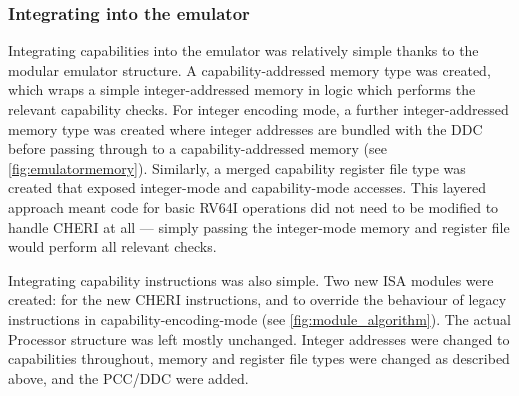 \subsubsection{Integrating into the emulator}
Integrating capabilities into the emulator was relatively simple thanks to the modular emulator structure.
A capability-addressed memory type was created, which wraps a simple integer-addressed memory in logic which performs the relevant capability checks.
For integer encoding mode, a further integer-addressed memory type was created where integer addresses are bundled with the DDC before passing through to a capability-addressed memory (see \cref{fig:emulatormemory}).
Similarly, a merged capability register file type was created that exposed integer-mode and capability-mode accesses.
This layered approach meant code for basic RV64I operations did not need to be modified to handle CHERI at all --- simply passing the integer-mode memory and register file would perform all relevant checks.

Integrating capability instructions was also simple.
Two new ISA modules were created:  for the new CHERI instructions, and  to override the behaviour of legacy instructions in capability-encoding-mode (see \cref{fig:module_algorithm}).
The actual Processor structure was left mostly unchanged.
Integer addresses were changed to capabilities throughout,
memory and register file types were changed as described above, and the PCC/DDC were added.
\pagebreak

